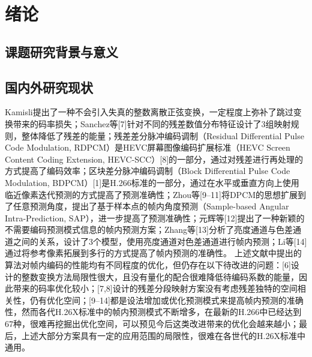 \chapter{绪论}
\label{cha:c1}

\section{课题研究背景与意义}

\section{国内外研究现状}
Kamisli\upcite{}提出了一种不会引入失真的整数离散正弦变换，一定程度上弥补了跳过变换带来的码率损失；Sanchez等[7]针对不同的残差数值分布特征设计了3组映射规则，整体降低了残差的能量；残差差分脉冲编码调制（Residual Differential Pulse Code Modulation, RDPCM）是HEVC屏幕图像编码扩展标准（HEVC Screen Content Coding Extension, HEVC-SCC）[8]的一部分，通过对残差进行再处理的方式提高了编码效率；区块差分脉冲编码调制（Block Differential Pulse Code Modulation, BDPCM）[1]是H.266标准的一部分，通过在水平或垂直方向上使用临近像素迭代预测的方式提高了预测准确性；Zhou等[9–11]将DPCM的思想扩展到了任意预测角度，提出了基于样本点的帧内角度预测（Sample-based Angular Intra-Prediction, SAP），进一步提高了预测准确性；元辉等[12]提出了一种新颖的不需要编码预测模式信息的帧内预测方案；Zhang等[13]分析了亮度通道与色差通道之间的关系，设计了3个模型，使用亮度通道对色差通道进行帧内预测；Li等[14]通过将参考像素拓展到多行的方式提高了帧内预测的准确性。
上述文献中提出的算法对帧内编码的性能均有不同程度的优化，但仍存在以下待改进的问题：[6]设计的整数变换方法局限性很大，且没有量化的配合很难降低待编码系数的能量，因此带来的码率优化较小；[7,8]设计的残差分段映射方案没有考虑残差独特的空间相关性，仍有优化空间；[9–14]都是设法增加或优化预测模式来提高帧内预测的准确性，然而各代H.26X标准中的帧内预测模式不断增多，在最新的H.266中已经达到67种，很难再挖掘出优化空间，可以预见今后这类改进带来的优化会越来越小；最后，上述大部分方案具有一定的应用范围的局限性，很难在各世代的H.26X标准中通用。

